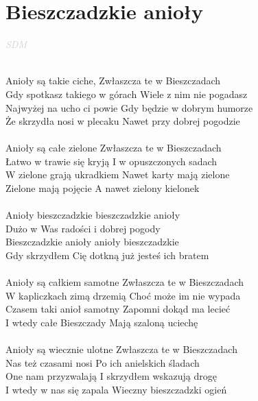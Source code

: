 \documentclass[a5paper, 10pt]{book}
\begin{document}
\newpage
\section{Bieszczadzkie anioły}\textcolor{lightgray}{\textit{SDM}}\\~\\
\begin{minipage}[t]{0.8\textwidth}
  Anioły są takie ciche, Zwłaszcza te w Bieszczadach\\
  Gdy spotkasz takiego w górach Wiele z nim nie pogadasz\\
  Najwyżej na ucho ci powie Gdy będzie w dobrym humorze\\
  Że skrzydła nosi w plecaku Nawet przy dobrej pogodzie\\
  \\
  Anioły są całe zielone Zwłaszcza te w Bieszczadach\\
  Łatwo w trawie się kryją I w opuszczonych sadach\\
  W zielone grają ukradkiem Nawet karty mają zielone\\
  Zielone mają pojęcie A nawet zielony kielonek\\
  \\
  \hspace*{4mm}Anioły bieszczadzkie bieszczadzkie anioły\\
  \hspace*{4mm}Dużo w Was radości i dobrej pogody\\
  \hspace*{4mm}Bieszczadzkie anioły anioły bieszczadzkie\\
  \hspace*{4mm}Gdy skrzydłem Cię dotkną już jesteś ich bratem\\
  \\
  Anioły są całkiem samotne Zwłaszcza te w Bieszczadach\\
  W kapliczkach zimą drzemią Choć może im nie wypada\\
  Czasem taki anioł samotny Zapomni dokąd ma lecieć\\
  I wtedy całe Bieszczady Mają szaloną uciechę\\
  \\
  Anioły są wiecznie ulotne Zwłaszcza te w Bieszczadach\\
  Nas też czasami nosi Po ich anielskich śladach\\
  One nam przyzwalają I skrzydłem wskazują drogę\\
  I wtedy w nas się zapala Wieczny bieszczadzki ogień\\
\end{minipage}
\end{document}
